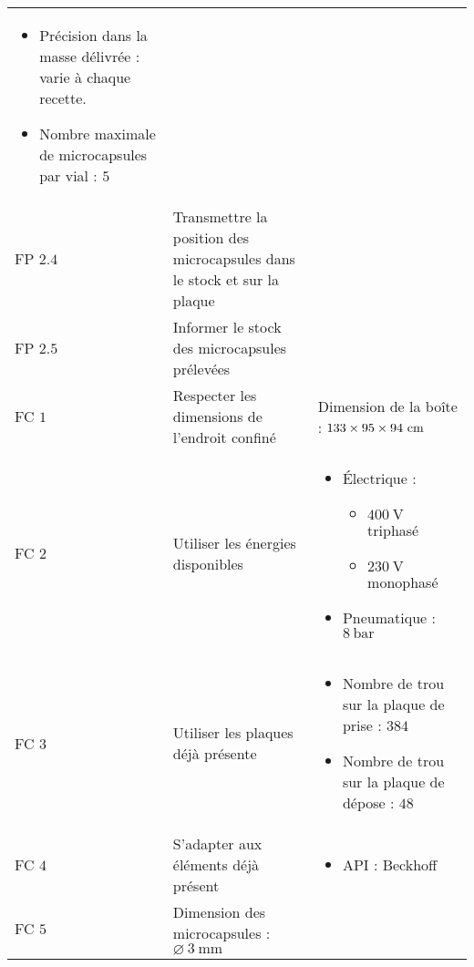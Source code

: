 \begin{longtable}{l|m{5cm}|m{5cm}}
\begin{itemize}
            \item Précision dans la masse délivrée : varie à chaque recette.
            \item Nombre maximale de microcapsules par vial : $5$
        \end{itemize}\\
        FP $2.4$&\centering Transmettre la position des microcapsules dans le stock et sur la plaque&\\
        FP $2.5$&\centering Informer le stock des microcapsules prélevées&\\
        FC $1$&\centering Respecter les dimensions de l'endroit confiné &Dimension de la boîte  : $\numproduct{133 x 95 x 94}~\unit{\cm}$\\
        FC $2$&\centering Utiliser les énergies disponibles& \begin{itemize}
            \item Électrique : \begin{itemize}
                \item $\qty{400}{\volt}$ triphasé
                \item $\qty{230}{\volt}$ monophasé
            \end{itemize}
            \item Pneumatique : $\qty{8}{\bar}$
        \end{itemize}\\ 
        FC $3$&\centering Utiliser les plaques déjà présente&\begin{itemize}
            \item Nombre de trou sur la plaque de prise : $384$
            \item Nombre de trou sur la plaque de dépose : $48$
        \end{itemize}\\
        FC $4$&\centering S'adapter aux éléments déjà présent&\begin{itemize}
            \item API : Beckhoff
        \end{itemize}\\
        FC $5$&\centering Dimension des microcapsules : $\varnothing~\qty{3}{\mm}$&

    \end{longtable}
